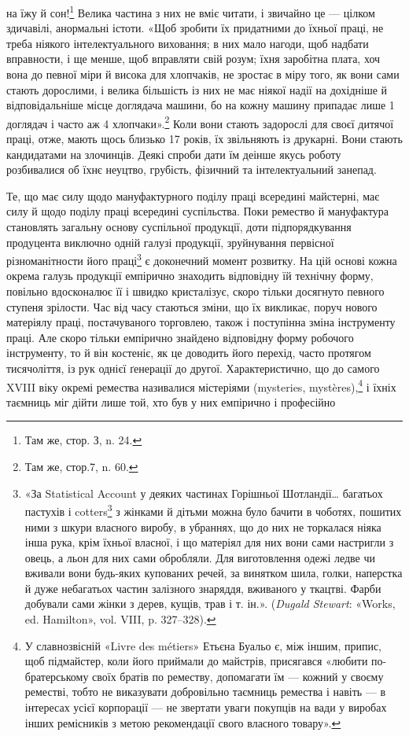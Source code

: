 \parcont{}  %
на їжу й сон!\footnote{
Там же, стор. З, n. 24.
} Велика частина з них не вміє читати, і звичайно
це — цілком здичавілі, анормальні істоти. «Щоб зробити їх
придатними до їхньої праці, не треба ніякого інтелектуального
виховання; в них мало нагоди, щоб надбати вправности, і ще
менше, щоб вправляти свій розум; їхня заробітна плата, хоч вона
до певної міри й висока для хлопчаків, не зростає в міру того, як
вони сами стають дорослими, і велика більшість із них не має
ніякої надії на дохідніше й відповідальніше місце доглядача
машини, бо на кожну машину припадає лише 1 доглядач і часто
аж 4 хлопчаки».\footnote{
Там же, стор.7, n. 60.
} Коли вони стають задорослі для своєї
дитячої праці, отже, мають щось близько 17 років, їх звільняють
із друкарні. Вони стають кандидатами на злочинців. Деякі спроби
дати їм деінше якусь роботу розбивалися об їхнє неуцтво, грубість,
фізичний та інтелектуальний занепад.

Те, що має силу щодо мануфактурного поділу праці всередині
майстерні, має силу й щодо поділу праці всередині суспільства.
Поки ремество й мануфактура становлять загальну основу суспільної
продукції, доти підпорядкування продуцента виключно
одній галузі продукції, зруйнування первісної різноманітности
його праці\footnote{
«За Statistical Account у деяких частинах Горішньої Шотландії\dots{}
багатьох пастухів і cotters\footnote*{
— селян. \emph{Ред.}
} з жінками й дітьми можна було бачити
в чоботях, пошитих ними з шкури власного виробу, в убраннях, що до
них не торкалася ніяка інша рука, крім їхньої власної, і що матеріял
для них вони сами настригли з овець, а льон для них сами обробляли.
Для виготовлення одежі ледве чи вживали вони будь-яких купованих
речей, за винятком шила, голки, наперстка й дуже небагатьох частин
залізного знаряддя, вживаного у ткацтві. Фарби добували сами жінки з
дерев, кущів, трав і т. ін.». (\emph{Dugald Stewart}: «Works, ed. Hamilton»,
vol. VIII, p. 327--328).
} є доконечний момент розвитку. На цій основі
кожна окрема галузь продукції емпірично знаходить відповідну
їй технічну форму, повільно вдосконалює її і швидко кристалізує,
скоро тільки досягнуто певного ступеня зрілости. Час від
часу стаються зміни, що їх викликає, поруч нового матеріялу
праці, постачуваного торговлею, також і поступінна зміна інструменту
праці. Але скоро тільки емпірично знайдено відповідну
форму робочого інструменту, то й він костеніє, як це доводить
його перехід, часто протягом тисячоліття, із рук однієї ґенерації
до другої. Характеристично, що до самого XVIII віку окремі
ремества називалися містеріями (mysteries, mystères),\footnote{
У славнозвісній «Livre des métiers» Етьєна Буальо є, між іншим,
припис, щоб підмайстер, коли його приймали до майстрів, присягався
«любити по-братерському своїх братів по реместву, допомагати їм —
кожний у своєму реместві, тобто не виказувати добровільно таємниць
ремества і навіть — в інтересах усієї корпорації — не звертати уваги
покупців на вади у виробах інших ремісників з метою рекомендації свого
власного товару».
} і їхніх таємниць міг дійти лише той, хто був у них емпірично і професійно
\parbreak{}  %
